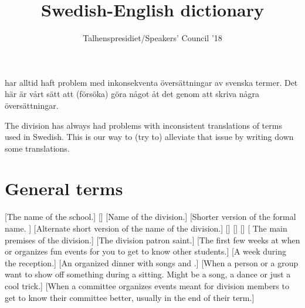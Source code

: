 \documentclass[a4paper]{article}
\title{Swedish-English dictionary}
\author{Talhenspresidiet/Speakers' Council '18}
\begin{document}
\begin{titlingpage}
    \maketitle
         har alltid haft problem med inkonsekventa översättningar
        av svenska termer. Det här är vårt sätt att (försöka) göra något åt det genom
        att skriva några översättningar.

        The division has always had problems with inconsistent translations
        of terms used in Swedish. This is our way to (try to) alleviate that issue
        by writing down some translations.
\end{titlingpage}


\newpage
\tableofcontents

\newpage
{}
\setcounter{page}{2}

\section{General terms}
\begin{description}
    [\formal The name of the school.]
    []
    [\formal Name of the division.]
    [Shorter version of the formal name. ]
    [Alternate short version of the name of the division.]
    []
    []
    []
    [ The main premises of the division.]
    [The division patron saint.]
    [The first few weeks at  when  or  organizes fun events for you to get to know other students.]
    [A week during the reception.]
    [An organized dinner with songs and .]
    [When a person or a group want to show off something during a sitting. Might be a song, a dance or just a cool trick.]
    [When a committee organizes events meant for division members to get to know their committee better, usually in the end of their term.]
\end{description}
\end{document}
